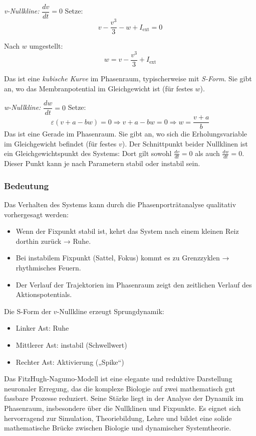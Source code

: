\begin{refsection}
\emph{v-Nullkline:} $\dfrac{dv}{dt} = 0$
\noindent
Setze:
\[
v - \frac{v^3}{3} - w + I_{\text{ext}} = 0
\]

\noindent
Nach $w$ umgestellt:
\[
w = v - \frac{v^3}{3} + I_{\text{ext}}
\]
\cite{nerven:JensBrouwer.20.08.2007}

Das ist eine \emph{kubische Kurve} im Phasenraum, typischerweise mit \emph{S-Form}.  
Sie gibt an, wo das Membranpotential im Gleichgewicht ist (für festes $w$).

\vspace{1em}

\emph{w-Nullkline:} $\dfrac{dw}{dt} = 0$
\noindent
Setze:
\[
\varepsilon (v + a - b w) = 0 \Rightarrow v + a - b w = 0 \Rightarrow w = \frac{v + a}{b}
\]
\cite{nerven:JensBrouwer.20.08.2007}
Das ist eine Gerade im Phasenraum.  
Sie gibt an, wo sich die Erholungsvariable im Gleichgewicht befindet (für festes $v$).
Der Schnittpunkt beider Nullklinen ist ein Gleichgewichtspunkt des Systems: Dort gilt sowohl $\frac{dv}{dt} = 0$ als
auch $\frac{dw}{dt} = 0$. Dieser Punkt kann je nach Parametern stabil oder instabil sein.
\cite{nerven:JensBrouwer.20.08.2007}
\subsubsection{Bedeutung}
Das Verhalten des Systems kann durch die Phasenporträtanalyse qualitativ vorhergesagt werden:
\begin{itemize}
	\item Wenn der Fixpunkt stabil ist, kehrt das System nach einem kleinen Reiz dorthin zurück → Ruhe.
	\item Bei instabilem Fixpunkt (Sattel, Fokus) kommt es zu Grenzzyklen → rhythmisches Feuern.
	\item Der Verlauf der Trajektorien im Phasenraum zeigt den zeitlichen Verlauf des Aktionspotentials.
\end{itemize}
\cite{nerven:JensBrouwer.20.08.2007}
Die S-Form der $v$-Nullkline erzeugt Sprungdynamik:
\begin{itemize}
	\item Linker Ast: Ruhe
	\item Mittlerer Ast: instabil (Schwellwert)
	\item Rechter Ast: Aktivierung („Spike“)
\end{itemize}
\cite{nerven:JensBrouwer.20.08.2007}
Das FitzHugh-Nagumo-Modell ist eine elegante und reduktive Darstellung neuronaler Erregung, das die komplexe Biologie auf zwei mathematisch gut fassbare Prozesse reduziert. Seine Stärke liegt in der Analyse der Dynamik im Phasenraum, insbesondere über die Nullklinen und Fixpunkte. Es eignet sich hervorragend zur Simulation, Theoriebildung, Lehre und bildet eine solide mathematische Brücke zwischen Biologie und dynamischer Systemtheorie.
\cite{nerven:InaLammers.31.08.2015}


\end{refsection}
